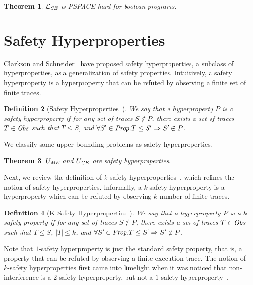 \documentclass[]{eptcs}
\newtheorem{theorem}{Theorem}[section]
\newtheorem{definition}[theorem]{Definition}
\begin{document}
\begin{theorem}
\label{thm:lsepspace}
$\mathcal{L}_{\it SE}$ is {\it PSPACE}-hard for boolean programs.
\end{theorem}

\section{Safety Hyperproperties}

\label{sec:safety}

Clarkson and Schneider~\cite{DBLP:journals/jcs/ClarksonS10} have
proposed safety hyperproperties, a subclass of hyperproperties, as a
generalization of safety properties.  Intuitively, a safety
hyperproperty is a hyperproperty that can be refuted by observing a
finite set of finite traces.
\begin{definition}[Safety Hyperproperties~\cite{DBLP:journals/jcs/ClarksonS10}] We say that a
hyperproperty $P$ is a safety hyperproperty if for any set of traces
$S\not\in P$, there exists a set of traces $T\in {\it Obs}$ such that
$T\le S$, and $\forall S'\in{\it Prop}. T\le S'\Rightarrow S'\not\in
P$.
\end{definition}

We classify some upper-bounding problems as safety hyperproperties.
\begin{theorem}
\label{thm:umeugesp}
  $U_{\it ME}$ and $U_{\it GE}$ are safety hyperproperties.
\end{theorem}

Next, we review the definition of $k$-safety
hyperproperties~\cite{DBLP:journals/jcs/ClarksonS10}, which refines
the notion of safety hyperproperties.  Informally, a $k$-safety
hyperproperty is a hyperproperty which can be refuted by observing $k$
number of finite traces.
\begin{definition}[K-Safety
  Hyperproperties~\cite{DBLP:journals/jcs/ClarksonS10}]
  We say that a hyperproperty $P$ is a $k$-safety property if for any
  set of traces $S\not\in P$, there exists a set of traces $T\in {\it
    Obs}$ such that $T\le S$, $|T|\le k$, and $\forall S'\in{\it
    Prop}. T\le S'\Rightarrow S'\not\in P$.
\end{definition}
Note that $1$-safety hyperproperty is just the standard safety
property, that is, a property that can be refuted by observing a
finite execution trace.  The notion of $k$-safety hyperproperties
first came into limelight when it was noticed that non-interference
is a $2$-safety hyperproperty, but not a $1$-safety
hyperproperty~\cite{terauchi:sas05}.
\end{document}
